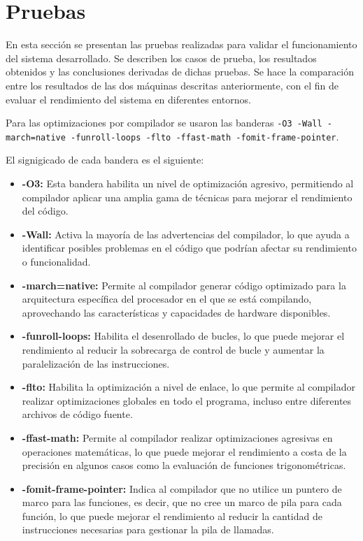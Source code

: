 

\section{Pruebas}
\label{sec:Pruebas}

En esta sección se presentan las pruebas realizadas para validar el funcionamiento del sistema desarrollado. Se describen los casos de prueba, los resultados obtenidos y las conclusiones derivadas de dichas pruebas. Se hace la comparación entre los resultados de las dos máquinas descritas anteriormente, con el fin de evaluar el rendimiento del sistema en diferentes entornos.

Para las optimizaciones por compilador se usaron las banderas \texttt{-O3 -Wall -march=native -funroll-loops -flto -ffast-math -fomit-frame-pointer}.

El signigicado de cada bandera es el siguiente:
\begin{itemize}
   \item \textbf{-O3:} Esta bandera habilita un nivel de optimización agresivo, permitiendo al compilador aplicar una amplia gama de técnicas para mejorar el rendimiento del código.
   \item \textbf{-Wall:} Activa la mayoría de las advertencias del compilador, lo que ayuda a identificar posibles problemas en el código que podrían afectar su rendimiento o funcionalidad.
   \item \textbf{-march=native:} Permite al compilador generar código optimizado para la arquitectura específica del procesador en el que se está compilando, aprovechando las características y capacidades de hardware disponibles.
   \item \textbf{-funroll-loops:} Habilita el desenrollado de bucles, lo que puede mejorar el rendimiento al reducir la sobrecarga de control de bucle y aumentar la paralelización de las instrucciones.
   \item \textbf{-flto:} Habilita la optimización a nivel de enlace, lo que permite al compilador realizar optimizaciones globales en todo el programa, incluso entre diferentes archivos de código fuente.
   \item \textbf{-ffast-math:} Permite al compilador realizar optimizaciones agresivas en operaciones matemáticas, lo que puede mejorar el rendimiento a costa de la precisión en algunos casos como la evaluación de funciones trigonométricas.
   \item \textbf{-fomit-frame-pointer:} Indica al compilador que no utilice un puntero de marco para las funciones, es decir, que no cree un marco de pila para cada función, lo que puede mejorar el rendimiento al reducir la cantidad de instrucciones necesarias para gestionar la pila de llamadas.
\end{itemize}







% 